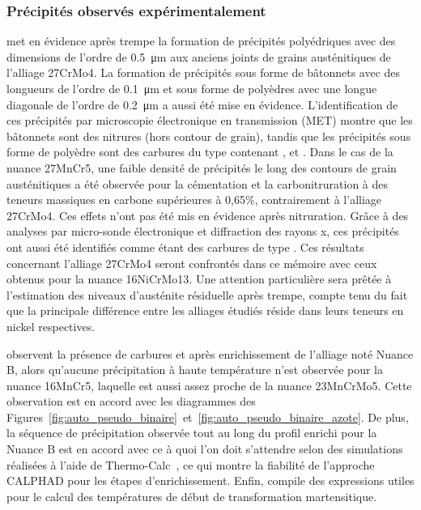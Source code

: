 \subsubsection*{Précipités observés expérimentalement}

\citet{Yahia1995} met en évidence après trempe la formation de précipités polyédriques avec des dimensions de l'ordre de \SI{0,5}{\micro\metre} aux anciens joints de grains austénitiques de l'alliage 27CrMo4. La formation de précipités sous forme de bâtonnets avec des longueurs de l'ordre de \SI{0,1}{\micro\metre} et sous forme de polyèdres avec une longue diagonale de l'ordre de \SI{0,2}{\micro\metre} a aussi été mise en évidence. L'identification de ces précipités par microscopie électronique en transmission (MET) montre que les bâtonnets sont des nitrures  (hors contour de grain), tandis que les précipités sous forme de polyèdre sont des carbures du type  contenant ,  et . Dans le cas de la nuance 27MnCr5, une faible densité de précipités le long des contours de grain austénitiques a été observée pour la cémentation et la carbonitruration à des teneurs massiques en carbone supérieures à 0,65\%, contrairement à l'alliage 27CrMo4. Ces effets n'ont pas été mis en évidence après nitruration. Grâce à des analyses par micro-sonde électronique et diffraction des rayons x, ces précipités ont aussi été identifiés comme étant des carbures de type . Ces résultats~\cite{Yahia1995,Loukachenko2006} concernant l'alliage 27CrMo4 seront confrontés dans ce mémoire avec ceux obtenus pour la nuance 16NiCrMo13. Une attention particulière sera prêtée à l'estimation des niveaux d'austénite résiduelle après trempe, compte tenu du fait que la principale différence entre les alliages étudiés réside dans leurs teneurs en nickel respectives.

\citet{Marray2014} observent la présence de carbures  et  après enrichissement de l'alliage noté \og{}Nuance B\fg{}, alors qu'aucune précipitation à haute température n'est observée pour la nuance 16MnCr5, laquelle est aussi assez proche de la nuance 23MnCrMo5. Cette observation est en accord avec les diagrammes des Figures~\ref{fig:auto_pseudo_binaire}~et~\ref{fig:auto_pseudo_binaire_azote}. De plus, la séquence de précipitation observée tout au long du profil enrichi pour la \og{}Nuance B\fg{} est en accord avec ce à quoi l'on doit s'attendre selon des simulations réalisées à l'aide de Thermo-Calc~\cite{Andersson2002,Borgenstam2000}, ce qui montre la fiabilité de l'approche CALPHAD pour les étapes d'enrichissement. Enfin, \citet{Marray2012} compile des expressions utiles pour le calcul des températures de début de transformation martensitique.

